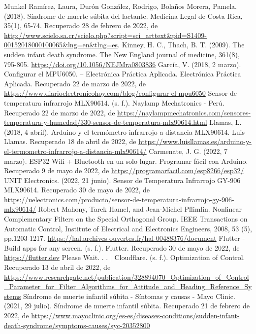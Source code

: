 
\begin{thebibliography}{00}
     Munkel Ramírez, Laura, Durón González, Rodrigo, Bolaños Morera, Pamela. (2018). Síndrome de muerte súbita del lactante. Medicina Legal de Costa Rica, 35(1), 65-74. Recuperado 28 de febrero de 2022, de \url{http://www.scielo.sa.cr/scielo.php?script=sci_arttext&pid=S1409-00152018000100065&lng=en&tlng=es}.
     Kinney, H. C., Thach, B. T. (2009). The sudden infant death syndrome. The New England journal of medicine, 361(8), 795-805. \url{https://doi.org/10.1056/NEJMra0803836}
     García, V. (2018, 2 marzo). Configurar el MPU6050. – Electrónica Práctica Aplicada. Electrónica Práctica Aplicada. Recuperado 22 de marzo de 2022, de \url{https://www.diarioelectronicohoy.com/blog/configurar-el-mpu6050}
     Sensor de temperatura infrarrojo MLX90614. (s. f.). Naylamp Mechatronics - Perú. Recuperado 22 de marzo de 2022, de \url{https://naylampmechatronics.com/sensores-temperatura-y-humedad/330-sensor-de-temperatura-mlx90614.html}
     Llamas, L. (2018, 4 abril). Arduino y el termómetro infrarrojo a distancia MLX90614. Luis Llamas. Recuperado 18 de abril de 2022, de \url{https://www.luisllamas.es/arduino-y-el-termometro-infrarrojo-a-distancia-mlx90614/}
     Carmenate, J. G. (2022, 7 marzo). ESP32 Wifi + Bluetooth en un solo lugar. Programar fácil con Arduino. Recuperado 9 de mayo de 2022, de \url{https://programarfacil.com/esp8266/esp32/}
     UNIT Electronics. (2022, 21 junio). Sensor de Temperatura Infrarrojo GY-906 MLX90614. Recuperado 30 de mayo de 2022, de \url{https://uelectronics.com/producto/sensor-de-temperatura-infrarrojo-gy-906-mlx90614/}
     Robert Mahony, Tarek Hamel, and Jean-Michel Pflimlin. Nonlinear Complementary Filters on the Special Orthogonal Group. IEEE Transactions on Automatic Control, Institute of Electrical and Electronics Engineers, 2008, 53 (5), pp.1203-1217. \url{https://hal.archives-ouvertes.fr/hal-00488376/document}
     Flutter - Build apps for any screen. (s. f.). Flutter. Recuperado 30 de mayo de 2022, de \url{https://flutter.dev}
     Please Wait. . . | Cloudflare. (s. f.). Optimization of Control. Recuperado 13 de abril de 2022, de \url{https://www.researchgate.net/publication/328894070_Optimization_of_Control_Parameter_for_Filter_Algorithms_for_Attitude_and_Heading_Reference_Systems}
     Síndrome de muerte infantil súbita - Síntomas y causas - Mayo Clinic. (2021, 29 julio). Síndrome de muerte infantil súbita. Recuperado 21 de febrero de 2022, de \url{https://www.mayoclinic.org/es-es/diseases-conditions/sudden-infant-death-syndrome/symptoms-causes/syc-20352800}

\end{thebibliography}
